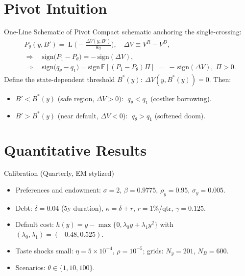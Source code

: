 \documentclass[aspectratio=169,11pt,professionalfonts]{beamer}
\newcommand{\E}{\mathbb{E}}
\newcommand{\1}{\mathbb{1}}
\DeclareMathOperator{\Lsig}{L}
\begin{document}
\section{Pivot Intuition}

\begin{frame}{One-Line Schematic of Pivot}
  Compact schematic anchoring the single-crossing:
  \begin{align*}
     & P_\theta(y,B')=\Lsig\!\Big(-\tfrac{\Delta V(y,B')}{\theta\eta}\Big),\quad \Delta V\equiv V^R{-}V^D,                                   \\
     & \Rightarrow\quad \mathrm{sign}\big( P_1{-}P_\theta\big)=-\,\mathrm{sign}(\Delta V),                                                   \\
     & \Rightarrow\quad \mathrm{sign}\big(q_\theta{-}q_1\big)=\mathrm{sign}\,\E[(P_1{-}P_\theta)\Pi]\;=\;-\,\mathrm{sign}(\Delta V),\;\Pi>0.
  \end{align*}
  Define the state-dependent threshold $B^*(y):\ \Delta V(y,B^*(y))=0$. Then:
  \begin{itemize}
    \item $B' < B^*(y)$ (safe region, $\Delta V>0$): $\;q_\theta<q_1$ (costlier borrowing).
    \item $B' > B^*(y)$ (near default, $\Delta V<0$): $\;q_\theta>q_1$ (softened doom).
  \end{itemize}
\end{frame}

\section{Quantitative Results}

\begin{frame}{Calibration (Quarterly, EM stylized)}
  \begin{itemize}
    \item Preferences and endowment: $\sigma=2$, $\beta=0.9775$, $\rho_y=0.95$,
          $\sigma_y=0.005$.
    \item Debt: $\delta=0.04$ (5y duration), $\kappa=\delta{+}r$, $r=1\%$/qtr,
          $\gamma=0.125$.
    \item Default cost: $h(y)=y-\max\{0,\lambda_0 y+\lambda_1 y^2\}$ with
          $(\lambda_0,\lambda_1)=(-0.48,0.525)$.
    \item Taste shocks small: $\eta=5\times10^{-4}$, $\rho=10^{-5}$; grids: $N_y{=}201$,
          $N_B{=}600$.
    \item Scenarios: $\theta\in\{1,10,100\}$.
  \end{itemize}
\end{frame}
\end{document}
